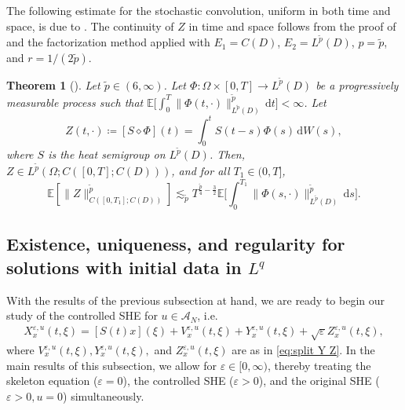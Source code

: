 \documentclass{amsart}
\theoremstyle{plain}
\newtheorem{theorem}{Theorem}[section]
\theoremstyle{remark}
\theoremstyle{plain}
\numberwithin{equation}{section}
\newcommand{\ceqq}{\coloneqq}
\newcommand{\col}{\colon}
\newcommand{\E}{{\mathbb E}}
\newcommand{\eps}{\varepsilon}
\newcommand{\Om}{\Omega}
\newcommand{\A}{{\mathcal A}}
\newcommand{\dd}{\,\mathrm{d}}
\begin{document}
The following estimate for the stochastic convolution, uniform in both time and space, is due to \cite[Th.\ 1.2]{Salins25SHE}. 
The continuity of $Z$ in time and space  follows from
the proof of \cite[Th.\ 1.2]{Salins25SHE} and the factorization method    
\cite[Prop.\ 5.9, Th.\ 5.10]{daprato} applied with $E_1=C(D)$, $E_2=L^{\tilde p}(D)$, $p=\tilde p$, and $r=1/(2\tilde p)$. 

\begin{theorem}[{\cite[Th.\ 1.2]{Salins25SHE}}]\label{th:stoch conv C}
    Let ${\tilde p}\in (6,\infty)$. Let $\Phi\col \Om\times [0,T]\to L^{\tilde p}(D)$ be a progressively measurable process  such that
$\E\big[\int_0^T \|\Phi(t,\cdot)\|_{L^{\tilde p}(D)}^{\tilde p}\dd t\big] <  \infty$. 
Let
\begin{equation*}
Z(t,\cdot)\ceqq [S\diamond \Phi](t)=\int_0^tS(t-s)\Phi(s)\dd W(s), 
\end{equation*}
where $S$ is the heat semigroup on $L^{\tilde p}(D)$. 
Then, $Z\in L^{\tilde p}(\Om;C([0,T];C(D)))$, and for all $T_1\in(0,T]$,  
\begin{equation*}
    \E[\|Z\|_{C([0,T_1];C(D))}^{\tilde p}]\lesssim_{\tilde p}T^{\frac{\tilde p}{4} - \frac{3}{2}} \E\Big[ \int_0^{T_1} \|\Phi(s,\cdot)\|_{L^{\tilde p}(D)}^{\tilde p}\dd s\Big].
\end{equation*}
\end{theorem}



\subsection{Existence, uniqueness, and regularity for solutions with initial data in $L^q$}\label{sub:wpn}

With the results of the previous subsection at hand, we are ready to begin our study of the controlled SHE for $u\in \A_N$, i.e. 
\begin{align*} 
  X_x^{\eps,u}(t,\xi) = [S(t)x](\xi)+V^{\eps,u}_x(t,\xi)+Y_x^{\eps,u}(t,\xi)+\sqrt{\eps}Z_x^{\eps,u}(t,\xi),
\end{align*}
where $V^{\eps,u}_x(t,\xi) , 
  Y_x^{\eps,u}(t,\xi),$ and $
  Z_x^{\eps,u}(t,\xi)$ are as in \eqref{eq:split Y Z}.  
In the main results of this subsection, we allow for $\eps\in[0,\infty)$, thereby treating the skeleton equation ($\eps=0$), the controlled SHE ($\eps>0$), and the original SHE ($\eps>0,u=0$) simultaneously.
\end{document}
